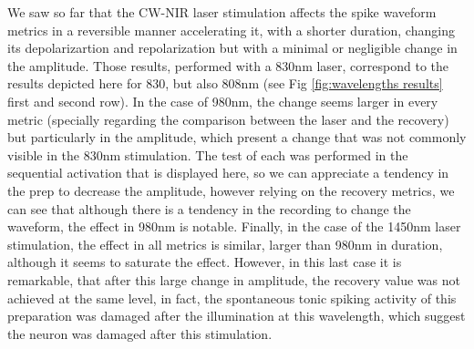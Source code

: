 We saw so far that the CW-NIR laser stimulation affects the spike waveform metrics in a reversible manner accelerating it, with a shorter duration, changing its depolarizartion and repolarization but with a minimal or negligible change in the amplitude. Those results, performed with a 830nm laser, correspond to the results depicted here for 830, but also 808nm (see Fig \ref{fig:wavelengths results} first and second row). In the case of 980nm, the change seems larger in every metric (specially regarding the comparison between the laser and the recovery) but particularly in the amplitude, which present a change that was not commonly visible in the 830nm stimulation. The test of each was performed in the sequential activation that is displayed here, so we can appreciate a tendency in the prep to decrease the amplitude, however relying on the recovery metrics, we can see that although there is a tendency in the recording to change the waveform, the effect in 980nm is notable. Finally, in the case of the 1450nm laser stimulation, the effect in all metrics is similar, larger than 980nm in duration, although it seems to saturate the effect. However, in this last case it is remarkable, that after this large change in amplitude, the recovery value was not achieved at the same level, in fact, the spontaneous tonic spiking activity of this preparation was damaged after the illumination at this wavelength, which suggest the neuron was damaged after this stimulation. 


